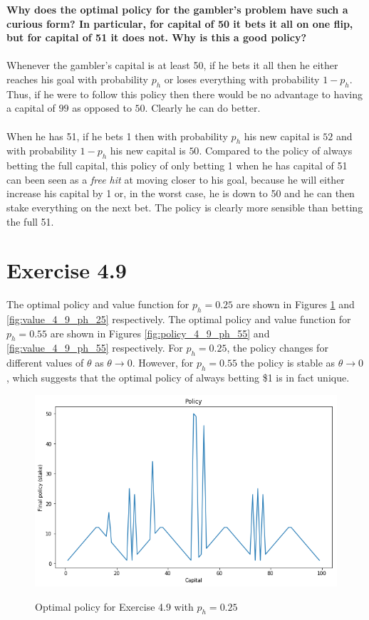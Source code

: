 \documentclass[a4paper,11pt]{article}
\numberwithin{equation}{section}
\theoremstyle{remark}
\begin{document}
\textbf{Why does the optimal policy for the gambler’s problem have such a curious form? In particular, for capital of 50 it bets it all on one flip, but for capital of 51 it does not. Why is this a good policy?}
\\ \\
Whenever the gambler's capital is at least 50, if he bets it all then he either reaches his goal with probability $p_h$ or loses everything with probability $1 - p_h$. Thus, if he were to follow this policy then there would be no advantage to having a capital of $99$ as opposed to $50$. Clearly he can do better. 
\\ \\
When he has 51, if he bets 1 then with probability $p_h$ his new capital is $52$ and with probability $1 - p_h$ his new capital is $50$. Compared to the policy of always betting the full capital, this policy of only betting 1 when he has capital of 51 can been seen as a \emph{free hit} at moving closer to his goal, because he will either increase his capital by 1 or, in the worst case, he is down to 50 and he can then stake everything on the next bet. The policy is clearly more sensible than betting the full 51.  

\section{Exercise 4.9}

The optimal policy and value function for $p_h = 0.25$ are shown in Figures \ref{fig:policy_4_9_ph_25} and \ref{fig:value_4_9_ph_25} respectively. The optimal policy and value function for $p_h = 0.55$ are shown in Figures \ref{fig:policy_4_9_ph_55} and \ref{fig:value_4_9_ph_55} respectively.
For $p_h = 0.25$, the policy changes for different values of $\theta$ as $\theta \rightarrow 0$. However, for $p_h = 0.55$ the policy is stable as $\theta \rightarrow 0$, which suggests that the optimal policy of always betting \$1 is in fact unique.

\begin{figure}
	\centering
	\caption{Optimal policy for Exercise 4.9 with $p_h = 0.25$}
	\includegraphics[scale=0.75]{policy_4_9_ph_25.png}
	\label{fig:policy_4_9_ph_25}
\end{figure}
\end{document}
